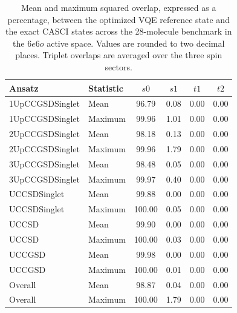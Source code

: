 \begin{table}[htbp]
    \centering
    \small
    \caption{Mean and maximum squared overlap, expressed as a percentage, between the optimized VQE reference state and the exact CASCI states across the 28-molecule benchmark in the $6e6o$ active space. Values are rounded to two decimal places. Triplet overlaps are averaged over the three spin sectors.}
    \label{tab:si-vqe-overlap}
    \begin{tabular}{@{}ll*{4}{S[table-format=3.2]}@{}}
        \toprule
        Ansatz & Statistic & {$s0$} & {$s1$} & {$t1$} & {$t2$} \\
        \midrule
        1UpCCGSDSinglet & Mean & 96.79 & 0.08 & 0.00 & 0.00 \\
        1UpCCGSDSinglet & Maximum & 99.96 & 1.01 & 0.00 & 0.00 \\
        2UpCCGSDSinglet & Mean & 98.18 & 0.13 & 0.00 & 0.00 \\
        2UpCCGSDSinglet & Maximum & 99.96 & 1.79 & 0.00 & 0.00 \\
        3UpCCGSDSinglet & Mean & 98.48 & 0.05 & 0.00 & 0.00 \\
        3UpCCGSDSinglet & Maximum & 99.97 & 0.40 & 0.00 & 0.00 \\
        UCCSDSinglet & Mean & 99.88 & 0.00 & 0.00 & 0.00 \\
        UCCSDSinglet & Maximum & 100.00 & 0.05 & 0.00 & 0.00 \\
        UCCSD & Mean & 99.90 & 0.00 & 0.00 & 0.00 \\
        UCCSD & Maximum & 100.00 & 0.03 & 0.00 & 0.00 \\
        UCCGSD & Mean & 99.98 & 0.00 & 0.00 & 0.00 \\
        UCCGSD & Maximum & 100.00 & 0.01 & 0.00 & 0.00 \\
        \midrule
        Overall & Mean & 98.87 & 0.04 & 0.00 & 0.00 \\
        Overall & Maximum & 100.00 & 1.79 & 0.00 & 0.00 \\
        \bottomrule
    \end{tabular}
\end{table}
